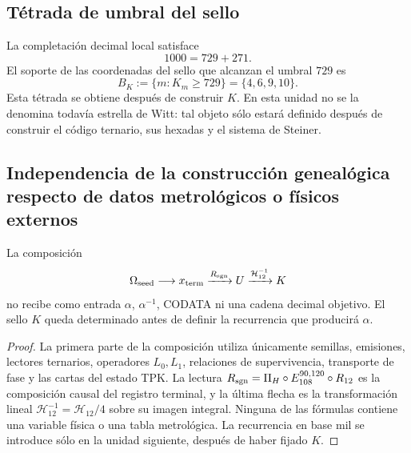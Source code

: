 \subsection{Tétrada de umbral del sello}

La completación decimal local satisface
\[
 1000=729+271.
\]
El soporte de las coordenadas del sello que alcanzan el umbral \(729\) es
\begin{equation}
 \boxed{
 B_K:=\{m:K_m\geq729\}=\{4,6,9,10\}.}
 \label{p12-83-c10-s1:eq:tetrada-umbral-k}
\end{equation}
Esta tétrada se obtiene después de construir \(K\). En esta unidad no se la
denomina todavía estrella de Witt: tal objeto sólo estará definido después
de construir el código ternario, sus hexadas y el sistema de Steiner.

\subsection{Independencia de la construcción genealógica respecto de datos metrológicos o físicos externos}

\begin{theorem}[Aislamiento de \(U\) y \(K\)]
\label{p12-83-c10-s1:thm:aislamiento-u-k-alpha-codata}
La composición
\begin{equation}
 \Omega_{\rm seed}\longrightarrow x_{\rm term}
 \xrightarrow{R_{\rm sgn}}U
 \xrightarrow{\mathcal H_{12}^{-1}}K
 \label{p12-83-c10-s1:eq:composicion-upstream-u-k}
\end{equation}
no recibe como entrada \(\alpha\), \(\alpha^{-1}\), CODATA ni una cadena
decimal objetivo. El sello \(K\) queda determinado antes de definir la
recurrencia que producirá \(\alpha\).
\end{theorem}

\begin{proof}
La primera parte de la composición utiliza únicamente semillas, emisiones,
lectores ternarios, operadores \(L_0,L_1\), relaciones de supervivencia,
transporte de fase y las cartas del estado TPK. La lectura
\(R_{\rm sgn}=\Pi_H\circ E_{108}^{90,120}\circ R_{12}\) es la composición
causal del registro terminal, y la última flecha es la transformación lineal
\(\mathcal H_{12}^{-1}=\mathcal H_{12}/4\)
sobre su imagen integral. Ninguna de las fórmulas contiene una variable
física o una tabla metrológica. La recurrencia en base mil se introduce sólo
en la unidad siguiente, después de haber fijado \(K\).
\end{proof}

